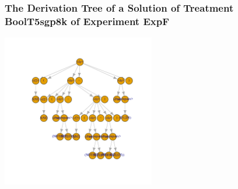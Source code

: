  \begin{frame}
 \frametitle{ The Derivation Tree of a Solution of Treatment BoolT5sgp8k of Experiment ExpF }
 \begin{center}
\includegraphics[width=0.5\textwidth, angle=0]
{ExpFDerivationTreeFigure009.pdf}
 \end{center}
 \label{report/ExpFDerivationTreeFigure009.pdf}  
 \end{frame}

